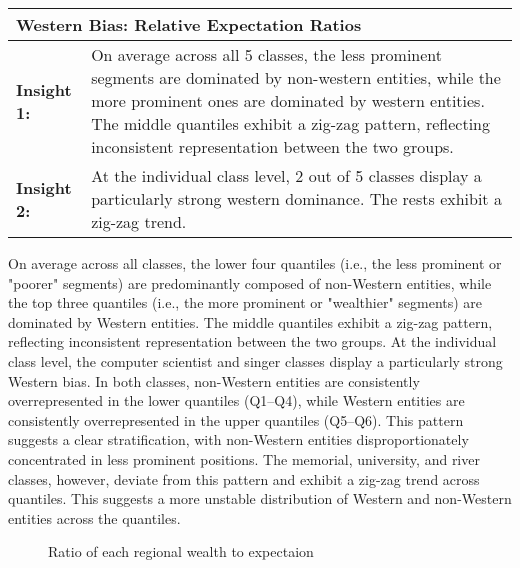 \begin{table}[h]
    \centering
    \renewcommand{\arraystretch}{1.3}
    \begin{tabular}{|l p{12cm}|} 
        \hline
        \multicolumn{2}{|l|}{\textbf{Western Bias: Relative Expectation Ratios}} \\
        \hline
        \textbf{Insight 1:} & On average across all 5 classes, the less prominent segments are dominated by non-western entities, while the more prominent ones are dominated by western entities. The middle quantiles exhibit a zig-zag pattern, reflecting inconsistent representation between the two groups. \\
        \textbf{Insight 2:} & At the individual class level, 2 out of 5 classes display a particularly strong western dominance. The rests exhibit a zig-zag trend. \\
        \hline
    \end{tabular}
\end{table}

On average across all classes, the lower four quantiles (i.e., the less prominent or "poorer" segments) are predominantly composed of non-Western entities, while the top three quantiles (i.e., the more prominent or "wealthier" segments) are dominated by Western entities. The middle quantiles exhibit a zig-zag pattern, reflecting inconsistent representation between the two groups. At the individual class level, the computer scientist and singer classes display a particularly strong Western bias. In both classes, non-Western entities are consistently overrepresented in the lower quantiles (Q1–Q4), while Western entities are consistently overrepresented in the upper quantiles (Q5–Q6). This pattern suggests a clear stratification, with non-Western entities disproportionately concentrated in less prominent positions. The memorial, university, and river classes, however, deviate from this pattern and exhibit a zig-zag trend across quantiles. This suggests a more unstable distribution of Western and non-Western entities across the quantiles.

\begin{figure}
\centering 
{}


\caption{Ratio of each regional wealth to expectaion}\label{fig:western - ratio of regional wealth to expectation}

\end{figure}